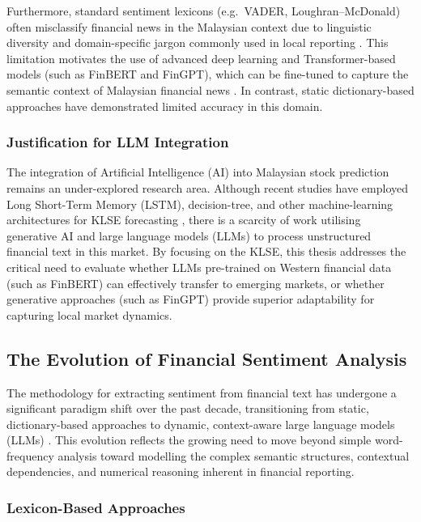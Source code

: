 \documentclass[12pt]{ucetd}
\begin{document}
Furthermore, standard sentiment lexicons (e.g.\ VADER, Loughran--McDonald) often misclassify financial news in the Malaysian context due to linguistic diversity and domain-specific jargon commonly used in local reporting \cite{loughran2011liability}. This limitation motivates the use of advanced deep learning and Transformer-based models (such as FinBERT and FinGPT), which can be fine-tuned to capture the semantic context of Malaysian financial news \cite{araci2019finbert, yang2020finbert, yang2023fingpt}. In contrast, static dictionary-based approaches have demonstrated limited accuracy in this domain.

\subsubsection{Justification for LLM Integration}

The integration of Artificial Intelligence (AI) into Malaysian stock prediction remains an under-explored research area. Although recent studies have employed Long Short-Term Memory (LSTM), decision-tree, and other machine-learning architectures for KLSE forecasting \cite{leong2021stock, sidek2023bursa, chia2023predictive}, there is a scarcity of work utilising generative AI and large language models (LLMs) to process unstructured financial text in this market. By focusing on the KLSE, this thesis addresses the critical need to evaluate whether LLMs pre-trained on Western financial data (such as FinBERT) can effectively transfer to emerging markets, or whether generative approaches (such as FinGPT) provide superior adaptability for capturing local market dynamics.



\subsection{The Evolution of Financial Sentiment Analysis}

The methodology for extracting sentiment from financial text has undergone a significant paradigm shift over the past decade, transitioning from static, dictionary-based approaches to dynamic, context-aware large language models (LLMs) \cite{chen2025bibliometric}. This evolution reflects the growing need to move beyond simple word-frequency analysis toward modelling the complex semantic structures, contextual dependencies, and numerical reasoning inherent in financial reporting.

\subsubsection{Lexicon-Based Approaches}
\end{document}
